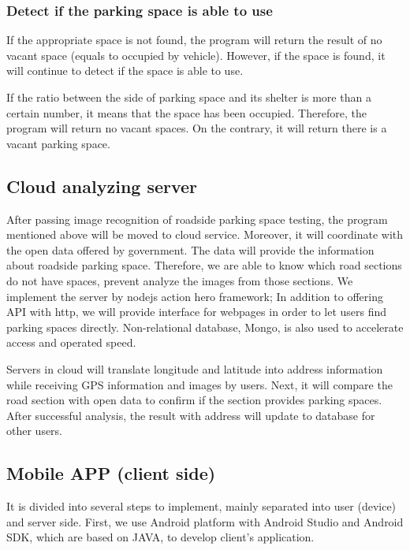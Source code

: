 \documentclass[runningheads,a4paper]{llncs}
\begin{document}
\subsubsection{Detect if the parking space is able to use}

If the appropriate space is not found, the program will return the
result of no vacant space (equals to occupied by vehicle). However, if
the space is found, it will continue to detect if the space is
able to use.

If the ratio between the side of parking space and its shelter is more
than a certain number, it means that the space has been occupied.
Therefore, the program will return no vacant spaces. On the contrary,
it will return there is a vacant parking space.

\subsection{Cloud analyzing server}

After passing image recognition of roadside parking space testing, the
program mentioned above will be moved to cloud service. Moreover, it will
coordinate with the open data offered by government. The data will
provide the information about roadside parking space. Therefore, we are
able to know which road sections do not have spaces, prevent analyze the
images from those sections. We implement the server by nodejs action
hero framework; In addition to offering API with http, we will provide
interface for webpages in order to let users find parking spaces
directly. Non-relational database, Mongo, is also used to accelerate
access and operated speed.

Servers in cloud will translate longitude and latitude into address
information while receiving GPS information and images by users. Next,
it will compare the road section with open data to confirm if the
section provides parking spaces. After successful analysis, the result
with address will update to database for other users.

\subsection{Mobile APP (client side)}

It is divided into several steps to implement, mainly separated into
user (device) and server side. First, we use Android platform with
Android Studio and Android SDK, which are based on JAVA, to develop
client's application.
\end{document}

